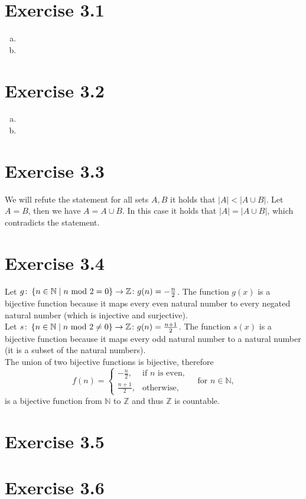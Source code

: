 \documentclass{article} %
\newcommand{\homeworkNumber}{3}
\begin{document}
\section*{Exercise \homeworkNumber.1}

\begin{enumerate}[(a)]
	\item
	\item
\end{enumerate}



\section*{Exercise \homeworkNumber.2}

\begin{enumerate}[(a)]
	\item
	\item
\end{enumerate}



\section*{Exercise \homeworkNumber.3}
We will refute the statement for all sets \( A,B \) it holds that \( |A| < |A \cup B| \). Let \( A = B \), then we have \( A = A \cup B \). In this case it holds that \( |A| = |A \cup B| \), which contradicts the statement.



\section*{Exercise \homeworkNumber.4}

Let \( g \colon \left\{ n \in \mathbb{N} \mid n \text{ mod } 2 = 0 \\ \right\} \to \mathbb{Z} \colon g(n) = -\frac{n}{2} \).
The function \( g(x) \) is a bijective function because it maps every
even natural number to every negated natural number (which is injective and surjective). \\
Let \( s \colon \left\{ n \in \mathbb{N} \mid n \text{ mod } 2 \neq  0 \\ \right\} \to \mathbb{Z} \colon g(n) = \frac{n+1}{2} \).
The function \( s(x) \) is a bijective function because it maps every odd natural number to a natural number
(it is a subset of the natural numbers). \\
The union of two bijective functions is bijective, therefore
\begin{equation*}
	f(n) =
	\begin{cases}
		-\frac{n}{2},  & \text{if } n \text{ is even}, \\
		\frac{n+1}{2}, & \text{otherwise},
	\end{cases}
	\quad \text{for } n \in \mathbb{N},
\end{equation*}
is a bijective function from \( \mathbb{N} \) to \( \mathbb{Z} \) and thus \( \mathbb{Z} \) is countable.


\section*{Exercise \homeworkNumber.5}


\section*{Exercise \homeworkNumber.6}
\end{document}

